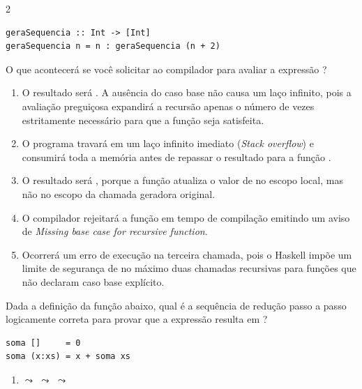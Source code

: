 \documentclass[a4paper,10pt,brazil]{article}
\begin{document}
\begin{multicols}{2}
\begin{verbatim}
geraSequencia :: Int -> [Int]
geraSequencia n = n : geraSequencia (n + 2)
\end{verbatim}

O que acontecerá se você solicitar ao compilador para avaliar a expressão ?

\begin{enumerate}
  \item O resultado será \haskellinline{[10, 12, 14]}. A ausência do caso base não causa um laço infinito, pois a avaliação preguiçosa expandirá a recursão apenas o número de vezes estritamente necessário para que a função  seja satisfeita.

  \item O programa travará em um laço infinito imediato (\emph{Stack overflow}) e consumirá toda a memória antes de repassar o resultado para a função .

  \item O resultado será \haskellinline{[10, 10, 10]}, porque a função atualiza o valor de  no escopo local, mas não no escopo da chamada geradora original.

  \item O compilador rejeitará a função  em tempo de compilação emitindo um aviso de \emph{Missing base case for recursive function}.

  \item Ocorrerá um erro de execução na terceira chamada, pois o Haskell impõe um limite de segurança de no máximo duas chamadas recursivas para funções que não declaram caso base explícito.

\end{enumerate}

Dada a definição da função  abaixo, qual é a sequência de redução passo a passo logicamente correta para provar que a expressão  resulta em ?

\begin{verbatim}
soma []     = 0
soma (x:xs) = x + soma xs
\end{verbatim}

\begin{enumerate}
  \item {} $\leadsto$  $\leadsto$  $\leadsto$ 


\end{enumerate}
\end{multicols}
\end{document}
